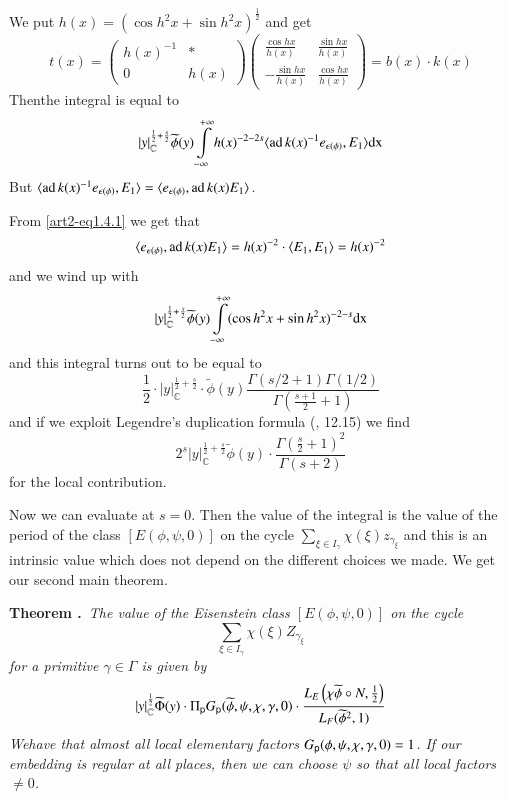 We put $h(x)=(\cos h^{2}x+\sin h^{2}x)^{\frac{1}{2}}$ and get
$$
t(x)=\left(\begin{matrix}
h(x)^{-1} & *\\
0 & h(x)
\end{matrix}\right)
\left(\begin{matrix}
\frac{\cos hx}{h(x)} & \frac{\sin hx}{h(x)}\\[4pt]
-\frac{\sin hx}{h(x)} & \frac{\cos hx}{h(x)}
\end{matrix}\right)
=b(x)\cdot k(x)
$$
Then\pageoriginale the integral is equal to
$$
|y|^{\frac{1}{2}+\frac{s}{2}}_{\mathbb{C}}\widetilde{\phi}(y)\int\limits^{+\infty}_{-\infty}h(x)^{-2-2s}\langle \operatorname{ad} k(x)^{-1}e_{\epsilon(\phi)},E_{1}\rangle \mathrm{dx}
$$
But $\langle \operatorname{ad} k(x)^{-1}e_{\epsilon(\phi)},E_{1}\rangle=\langle e_{\epsilon(\phi)},\operatorname{ad} k(x)E_{1}\rangle$.

From \eqref{art2-eq1.4.1} we get that
$$
\langle e_{\epsilon(\phi)},\operatorname{ad} k(x)E_{1}\rangle =h(x)^{-2}\cdot \langle E_{1},E_{1}\rangle =h(x)^{-2}
$$
and we wind up with
$$
|y|^{\frac{1}{2}+\frac{s}{2}}_{\mathbb{C}}\widetilde{\phi}(y)\int\limits^{+\infty}_{-\infty}(\cos h^{2}x+\sin h^{2}x)^{-2-s}\mathrm{dx}
$$
and this integral turns out to be equal to
$$
\frac{1}{2}\cdot |y|^{\frac{1}{2}+\frac{s}{2}}_{\mathbb{C}}\cdot \widetilde{\phi}(y)\dfrac{\Gamma(s/2+1)\Gamma(1/2)}{\Gamma\left(\frac{s+1}{2}+1\right)}
$$
and if we exploit Legendre's duplication formula (\cite{art2-key28}, 12.15) we find
$$
2^{s}|y|^{\frac{1}{2}+\frac{s}{2}}_{\mathbb{C}}\widetilde{\phi}(y)\cdot \frac{\Gamma\left(\frac{s}{2}+1\right)^{2}}{\Gamma(s+2)}
$$
for the local contribution.

Now we can evaluate at $s=0$. Then the value of the integral is the value of the period of the class $[E(\phi,\psi,0)]$ on the cycle $\sum\limits_{\xi\in I_{\gamma}}\chi(\xi)z_{\gamma_{\xi}}$ and this is an intrinsic value which does not depend on the different choices we made. We get our second main theorem.

\medskip
\noindent
{\bf Theorem .\label{art2-thm3.1.6}}~{\em The value of the Eisenstein class $[E(\phi,\psi,0)]$ on the cycle}
$$
\sum\limits_{\xi\in I_{\gamma}}\chi(\xi)Z_{\gamma_{\xi}}
$$
{\em for a primitive $\gamma\in \Gamma$ is given by}
$$
|y|^{\frac{1}{2}}_{\mathbb{C}}\widetilde{\Phi}(y)\cdot \Pi_{\mathsf{p}}G_{\mathsf{p}}(\widetilde{\phi},\psi,\chi,\gamma,0)\cdot \dfrac{L_{E}\left(\chi\widetilde{\phi}\circ N,\frac{1}{2}\right)}{L_{F}(\widetilde{\phi}^{2},1)}
$$
{\em We\pageoriginale have that almost all local elementary factors $G_{\mathsf{p}}(\phi,\psi,\chi,\gamma,0)=1$. If our embedding is regular at all places, then we can choose $\psi$ so that all local factors $\neq 0$.}


